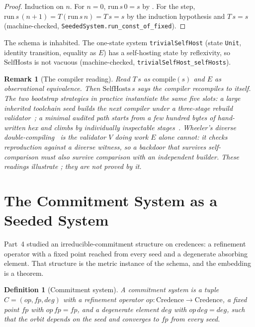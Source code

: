 \documentclass[11pt,a4paper]{article}
\newtheorem{definition}[theorem]{Definition}
\newtheorem{remark}[theorem]{Remark}
\newcommand{\SelfHosts}{\mathrm{SelfHosts}}
\newcommand{\run}{\mathrm{run}}
\begin{document}
\begin{proof}
Induction on $n$.
For $n = 0$, $\run\,s\,0 = s$ by .
For the step, $\run\,s\,(n+1) = T(\run\,s\,n) = T\,s = s$ by the induction
hypothesis and $T\,s = s$
(machine-checked, \texttt{SeededSystem.run\_const\_of\_fixed}).
\end{proof}

The schema is inhabited.
The one-state system \texttt{trivialSelfHost} (state \texttt{Unit}, identity
transition, equality as $E$) has a self-hosting state by reflexivity, so
$\SelfHosts$ is not vacuous
(machine-checked, \texttt{trivialSelfHost\_selfHosts}).

\begin{remark}[The compiler reading]
\label{rem:compiler}
Read $T\,s$ as $\mathrm{compile}(s)$ and $E$ as observational equivalence.
Then $\SelfHosts\,s$ says the compiler recompiles to itself.
The two bootstrap strategies in practice instantiate the same five slots:
a large inherited toolchain seed builds the next compiler under a three-stage
rebuild validator~\cite{thompson1984}; a minimal audited path starts from a
few hundred bytes of hand-written hex and climbs by individually inspectable
stages~\cite{stage0,bootstrappable}.
Wheeler's diverse double-compiling~\cite{wheeler2005} is the validator $V$
doing work $E$ alone cannot: it checks reproduction against a diverse witness,
so a backdoor that survives self-comparison must also survive comparison with
an independent builder.
These readings illustrate ; they are not proved by it.
\end{remark}

\section{The Commitment System as a Seeded System}
\label{sec:commitment}

Part~4 studied an irreducible-commitment structure on credences: a refinement
operator with a fixed point reached from every seed and a degenerate absorbing
element.
That structure is the metric instance of the schema, and the embedding is a
theorem.

\begin{definition}[Commitment system]
\label{def:commitment}
A \emph{commitment system} is a tuple $C = (op, fp, deg)$ with a refinement
operator $op : \mathrm{Credence} \to \mathrm{Credence}$, a fixed point
$fp$ with $op\,fp = fp$, and a degenerate element $deg$ with $op\,deg = deg$,
such that the orbit depends on the seed and converges to $fp$ from every seed.
\end{definition}
\end{document}
